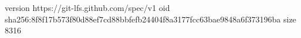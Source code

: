 version https://git-lfs.github.com/spec/v1
oid sha256:8f8f17b573f80d88ef7cd88bbfefb24404f8a3177fcc63bae9848a6f373196ba
size 8316
